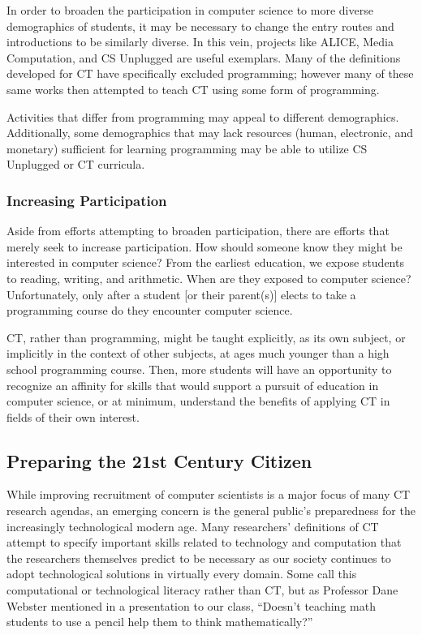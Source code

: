 \documentclass{acm_proc_article-sp}
\begin{document}
In order to broaden the participation in computer science to more diverse demographics of students, it may be necessary to change the entry routes and introductions to be similarly diverse. In this vein, projects like ALICE\cite{pausch1995alice}, Media Computation\cite{guzdial2003media}, and CS Unplugged\cite{csunplugged} are useful exemplars. Many of the definitions developed for CT have specifically excluded programming; however many of these same works then attempted to teach CT using some form of programming.

Activities that differ from programming may appeal to different demographics. Additionally, some demographics that may lack resources (human, electronic, and monetary) sufficient for learning programming may be able to utilize CS Unplugged or CT curricula.

\subsubsection{Increasing Participation}
Aside from efforts attempting to broaden participation, there are efforts that merely seek to increase participation. How should someone know they might be interested in computer science? From the earliest education, we expose students to reading, writing, and arithmetic. When are they exposed to computer science? Unfortunately, only after a student [or their parent(s)] elects to take a programming course do they encounter computer science. 

CT, rather than programming, might be taught explicitly, as its own subject, or implicitly in the context of other subjects, at ages much younger than a high school programming course. Then, more students will have an opportunity to recognize an affinity for skills that would support a pursuit of education in computer science, or at minimum, understand the benefits of applying CT in fields of their own interest.

\subsection{Preparing the 21st Century Citizen}
While improving recruitment of computer scientists is a major focus of many CT research agendas, an emerging concern is the general public’s preparedness for the increasingly technological modern age. Many researchers’ definitions of CT attempt to specify important skills related to technology and computation that the researchers themselves predict to be necessary as our society continues to adopt technological solutions in virtually every domain. Some call this computational or technological literacy rather than CT, but as Professor Dane Webster mentioned in a presentation to our class, ``Doesn{'}t teaching math students to use a pencil help them to think mathematically?''
\end{document}

